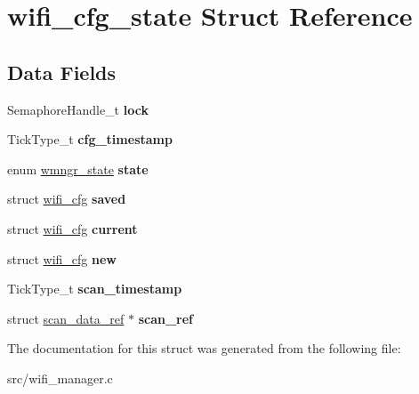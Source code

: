 \hypertarget{structwifi__cfg__state}{}\section{wifi\+\_\+cfg\+\_\+state Struct Reference}
\label{structwifi__cfg__state}
\subsection*{Data Fields}
\begin{DoxyCompactItemize}
\item 
\mbox{\label{structwifi__cfg__state_a8232b1594dd998a29cc541a263c80a19}} 
Semaphore\+Handle\+\_\+t {\bfseries lock}
\item 
\mbox{\label{structwifi__cfg__state_a21c8be408ce626dc5b4a0bc0830cf43b}} 
Tick\+Type\+\_\+t {\bfseries cfg\+\_\+timestamp}
\item 
\mbox{\label{structwifi__cfg__state_a638179d7f5cecd2d2856e26b11808381}} 
enum \mbox{\hyperlink{wifi__manager_8h_acfa752b31a99436ae37776ac0124ccef}{wmngr\+\_\+state}} {\bfseries state}
\item 
\mbox{\label{structwifi__cfg__state_a204002dfad126aa14d422132fbd29a86}} 
struct \mbox{\hyperlink{structwifi__cfg}{wifi\+\_\+cfg}} {\bfseries saved}
\item 
\mbox{\label{structwifi__cfg__state_ac0202eefa9ffbe9b07c2f060bee6d516}} 
struct \mbox{\hyperlink{structwifi__cfg}{wifi\+\_\+cfg}} {\bfseries current}
\item 
\mbox{\label{structwifi__cfg__state_a495653c9ca55e9da3279ed1f8377ae11}} 
struct \mbox{\hyperlink{structwifi__cfg}{wifi\+\_\+cfg}} {\bfseries new}
\item 
\mbox{\label{structwifi__cfg__state_a89e93fde2ca6d0b247ab271e773295e2}} 
Tick\+Type\+\_\+t {\bfseries scan\+\_\+timestamp}
\item 
\mbox{\label{structwifi__cfg__state_a6b279b5b50723edcb1d263152ac40cae}} 
struct \mbox{\hyperlink{structscan__data__ref}{scan\+\_\+data\+\_\+ref}} $\ast$ {\bfseries scan\+\_\+ref}
\end{DoxyCompactItemize}


The documentation for this struct was generated from the following file\+:\begin{DoxyCompactItemize}
\item 
src/wifi\+\_\+manager.\+c\end{DoxyCompactItemize}
